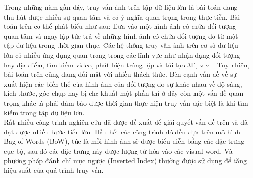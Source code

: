 \begin{abstracts}         
Trong những năm gần đây, truy vấn ảnh trên tập dữ liệu lớn là bài toán đang thu hút được nhiều sự quan tâm và có ý nghĩa quan trọng trong thực tiễn. Bài toán trên có thể phát biểu như sau: Đưa vào một hình ảnh có chứa đối tượng quan tâm và ngay lập tức trả về những hình ảnh có chứa đối tượng đó từ một tập dữ liệu trong thời gian thực. Các hệ thống truy vấn ảnh trên cơ sở dữ liệu lớn có nhiều ứng dụng quan trọng trong các lĩnh vực như nhận dạng đối tượng hay địa điểm, tìm kiếm video, phát hiện trùng lặp và tái tạo 3D, v.v... Tuy nhiên, bài toán trên cũng đang đối mặt với nhiều thách thức. Bên cạnh vấn đề về sự xuất hiện các biến thể của hình ảnh của đối tượng do sự khác nhau về độ sáng, kích thước, góc chụp hay bị che khuất một phần thì ở đây còn một vấn đề quan trọng khác là phải đảm bảo được thời gian thực hiện truy vấn đặc biệt là khi tìm kiếm trong tập dữ liệu lớn.\\
Rất nhiều công trình nghiên cứu đã được đề xuất để giải quyết vấn đề trên và đã đạt được nhiều bước tiến lớn. Hầu hết các công trình đó đều dựa trên mô hình Bag-of-Words (BoW), tức là mỗi hình ảnh sẽ được biểu diễn bằng các đặc trưng cục bộ, sau đó các đặc trưng này được lượng tử hóa vào các visual word. Và phương pháp đánh chỉ mục ngược (Inverted Index) thường được sử dụng để tăng hiệu suất của quá trình truy vấn.


\end{abstracts}
 